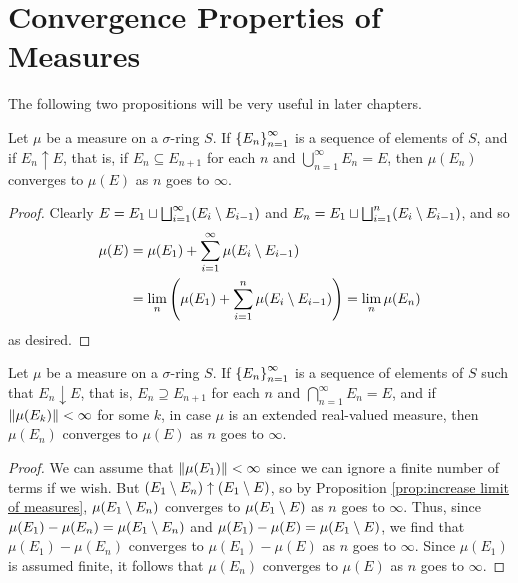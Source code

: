 \section{Convergence Properties of Measures}

The following two propositions will be very useful in later chapters.

\begin{proposition}
\label{prop:increase limit of measures}
Let $\mu$ be a measure on a $\sigma$-ring $S$. If $\left\{E_n\right\}_{n=1}^\infty$ is a sequence of elements of $S$, and if $E_n\uparrow E$, that is, if $E_n\subseteq E_{n+1}$ for each $n$ and $\bigcup_{n=1}^\infty E_n=E$, then $\mu(E_n)$ converges to $\mu(E)$ as $n$ goes to $\infty$. 
\end{proposition}

\begin{proof}
Clearly $E=E_1\sqcup\bigsqcup_{i=1}^\infty(E_i\setminus E_{i-1})$ and $E_n=E_1\sqcup\bigsqcup_{i=1}^n(E_i\setminus E_{i-1})$, and so
\begin{align*}
\mu(E)&=\mu(E_1) + \sum_{i=1}^\infty \mu(E_i\setminus E_{i-1})\\
&=\lim_{n}\left(\mu(E_1)+\sum_{i=1}^n\mu(E_i\setminus E_{i-1})\right)=\lim_n\mu(E_n)
\end{align*}
as desired.
\end{proof}

\begin{proposition}
\label{prop:decrease limit of measures}
Let $\mu$ be a measure on a $\sigma$-ring $S$. If $\left\{E_n\right\}_{n=1}^\infty$ is a sequence of elements of $S$ such that $E_n\downarrow E$, that is, $E_n \supseteq E_{n+1}$ for each $n$ and $\bigcap_{n=1}^\infty E_n=E$, and if $\norm{\mu(E_k)}<\infty$ for some $k$, in case $\mu$ is an extended real-valued measure, then $\mu(E_n)$ converges to $\mu(E)$ as $n$ goes to $\infty$.
\end{proposition}

\begin{proof}
We can assume that $\norm{\mu(E_1)}<\infty$ since we can ignore a finite number of terms if we wish. But $(E_1\setminus E_n)\uparrow(E_1\setminus E)$, so by Proposition \ref{prop:increase limit of measures}, $\mu(E_1\setminus E_n)$ converges to $\mu(E_1\setminus E)$ as $n$ goes to $\infty$. Thus, since $\mu(E_1)-\mu(E_n)=\mu(E_1\setminus E_n)$ and $\mu(E_1)-\mu(E)=\mu(E_1\setminus E)$, we find that $\mu(E_1)-\mu(E_n)$ converges to $\mu(E_1)-\mu(E)$ as $n$ goes to $\infty$. Since $\mu(E_1)$ is assumed finite, it follows that $\mu(E_n)$ converges to $\mu(E)$ as $n$ goes to $\infty$.
\end{proof}

